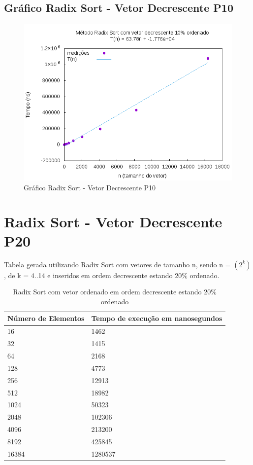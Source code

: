 \documentclass[12pt,a4paper,twoside]{report}
\begin{document}
\subsection{Gráfico Radix Sort - Vetor Decrescente P10}
\begin{figure}[H]
    \centering
    \includegraphics[width=0.7\linewidth]{graficos/RadixSort/vIntDecrescenteP10/vIntDecrescenteP10.png}
  \caption{Gráfico Radix Sort - Vetor Decrescente P10}
\end{figure}

\section{Radix Sort - Vetor Decrescente P20}
Tabela gerada utilizando Radix Sort com vetores de tamanho n, sendo n = $(2^k)$, de k = 4..14 e inseridos em ordem decrescente estando 20\% ordenado.
\begin{table}[H]
\centering
\caption{Radix Sort com vetor ordenado em ordem decrescente estando 20\% ordenado}
\label{my-label}
\begin{tabular}{|l|l|}
\hline
\multicolumn{1}{|c|}{\textbf{Número de Elementos}} & \multicolumn{1}{c|}{\textbf{Tempo de execução em nanosegundos}} \\ \hline
16 & 1462 \\ \hline
32 & 1415 \\ \hline
64 & 2168 \\ \hline
128 & 4773 \\ \hline
256 & 12913 \\ \hline
512 & 18982 \\ \hline
1024 & 50323 \\ \hline
2048 & 102306 \\ \hline
4096 & 213200 \\ \hline
8192 & 425845 \\ \hline
16384 & 1280537 \\ \hline
\end{tabular}
\end{table}
\end{document}
